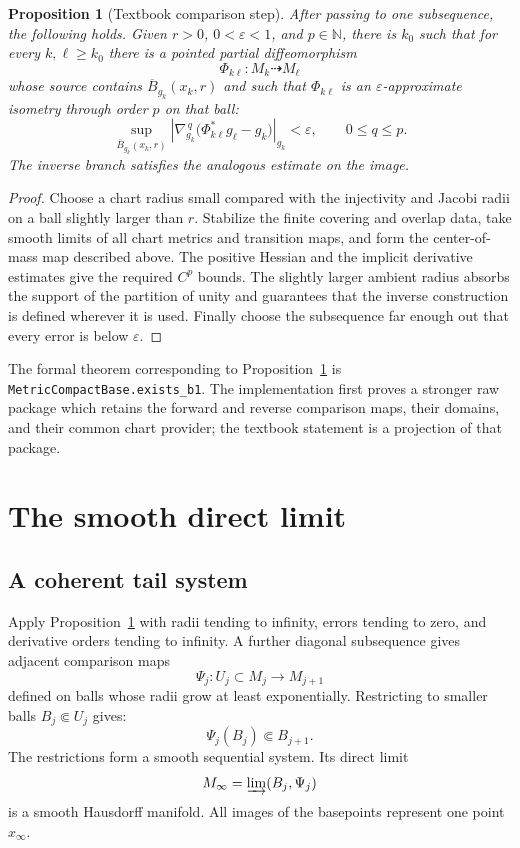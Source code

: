 \documentclass[11pt]{article}
\theoremstyle{plain}
\newtheorem{proposition}[theorem]{Proposition}
\theoremstyle{definition}
\theoremstyle{remark}
\newcommand{\eps}{\varepsilon}
\newcommand{\N}{\mathbb N}
\newcommand{\norm}[1]{\left|#1\right|}
\newcommand{\leanref}[1]{\nolinkurl{#1}}
\begin{document}
\begin{proposition}[Textbook comparison step]\label{prop:b1}
After passing to one subsequence, the following holds.  Given \(r>0\),
\(0<\eps<1\), and \(p\in\N\), there is \(k_0\) such that for every
\(k,\ell\geq k_0\) there is a pointed partial diffeomorphism
\[
  \Phi_{k\ell}:M_k\dashrightarrow M_\ell
\]
whose source contains \(\overline{B}_{g_k}(x_k,r)\) and such that
\(\Phi_{k\ell}\) is an \(\eps\)-approximate isometry through order \(p\) on
that ball:
\[
  \sup_{\overline{B}_{g_k}(x_k,r)}
  \norm{\nabla_{g_k}^{\,q}
  \bigl(\Phi_{k\ell}^*g_\ell-g_k\bigr)}_{g_k}
  <\eps,
  \qquad 0\leq q\leq p.
\]
The inverse branch satisfies the analogous estimate on the image.
\end{proposition}

\begin{proof}
Choose a chart radius small compared with the injectivity and Jacobi radii on
a ball slightly larger than \(r\).  Stabilize the finite covering and overlap
data, take smooth limits of all chart metrics and transition maps, and form
the center-of-mass map described above.  The positive Hessian and the
implicit derivative estimates give the required \(C^p\) bounds.  The
slightly larger ambient radius absorbs the support of the partition of unity
and guarantees that the inverse construction is defined wherever it is
used.  Finally choose the subsequence far enough out that every error is
below \(\eps\).
\end{proof}

The formal theorem corresponding to Proposition~\ref{prop:b1} is
\leanref{MetricCompactBase.exists_b1}.  The implementation first proves a
stronger raw package which retains the forward and reverse comparison maps,
their domains, and their common chart provider; the textbook statement is a
projection of that package.

\section{The smooth direct limit}

\subsection{A coherent tail system}

Apply Proposition~\ref{prop:b1} with radii tending to infinity, errors tending
to zero, and derivative orders tending to infinity.  A further diagonal
subsequence gives adjacent comparison maps
\[
  \Psi_j:U_j\subset M_j\longrightarrow M_{j+1}
\]
defined on balls whose radii grow at least exponentially.  Restricting to
smaller balls \(B_j\Subset U_j\) gives:
\[
  \Psi_j(B_j)\Subset B_{j+1}.
\]
The restrictions form a smooth sequential system.  Its direct limit
\[
  M_\infty=\varinjlim(B_j,\Psi_j)
\]
is a smooth Hausdorff manifold.  All images of the basepoints represent one
point \(x_\infty\).
\end{document}

